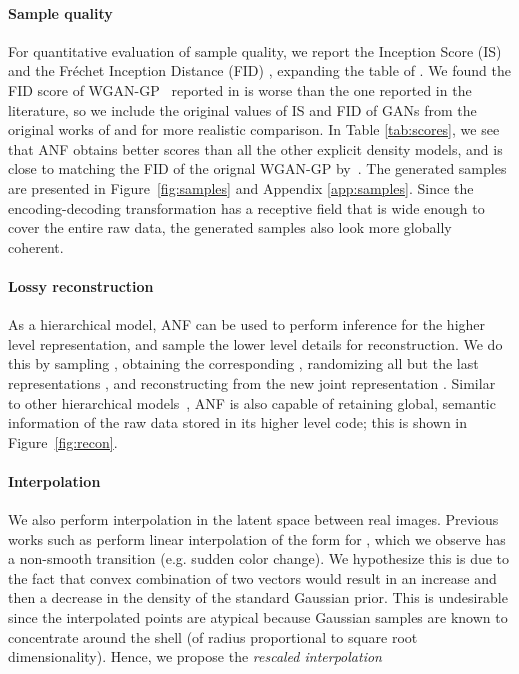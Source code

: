\documentclass{article}
\begin{document}
\paragraph{Sample quality} For quantitative evaluation of sample quality, we report the Inception Score (IS) \citep{salimans2016improved} and the Fréchet Inception Distance (FID) \citep{heusel2017gans}, expanding the table of \citet{ostrovski2018autoregressive}. 
We found the FID score of WGAN-GP~\citep{gulrajani2017improved} reported in \citet{ostrovski2018autoregressive} is worse than the one reported in the literature, so we include the original values of IS and FID of GANs from the original works of \citet{gulrajani2017improved} and \citet{heusel2017gans} for more realistic comparison.
In Table \ref{tab:scores}, we see that ANF obtains better scores than all the other explicit density models, and is close to matching the FID of the orignal WGAN-GP by~\citet{gulrajani2017improved}. 
The generated samples are presented in Figure~\ref{fig:samples} and Appendix \ref{app:samples}.
Since the encoding-decoding transformation has a receptive field that is wide enough to cover the entire raw data, the generated samples also look more globally coherent. 

\paragraph{Lossy reconstruction}
As a hierarchical model, ANF can be used to perform inference for the higher level representation, and sample the lower level details for reconstruction. 
We do this by sampling , obtaining the corresponding , randomizing all but the last representations , and reconstructing from the new joint representation . 
Similar to other hierarchical models~\citep{gulrajani2017pixelvae, belghazi2018hierarchical}, 
ANF is also capable of retaining global, semantic information of the raw data stored in its higher level code; this is shown in Figure~\ref{fig:recon}.

\paragraph{Interpolation}
We also perform interpolation in the latent space between real images. 
Previous works such as \citet{kingma2018glow} perform linear interpolation of the form  for , which we observe has a non-smooth transition (e.g. sudden color change). 
We hypothesize this is due to the fact that convex combination of two vectors would result in an increase and then a decrease in the density of the standard Gaussian prior. 
This is undesirable since the interpolated points are atypical because Gaussian samples are known to concentrate around the shell (of radius proportional to square root dimensionality). 
Hence, we propose the \emph{rescaled interpolation}
\end{document}
